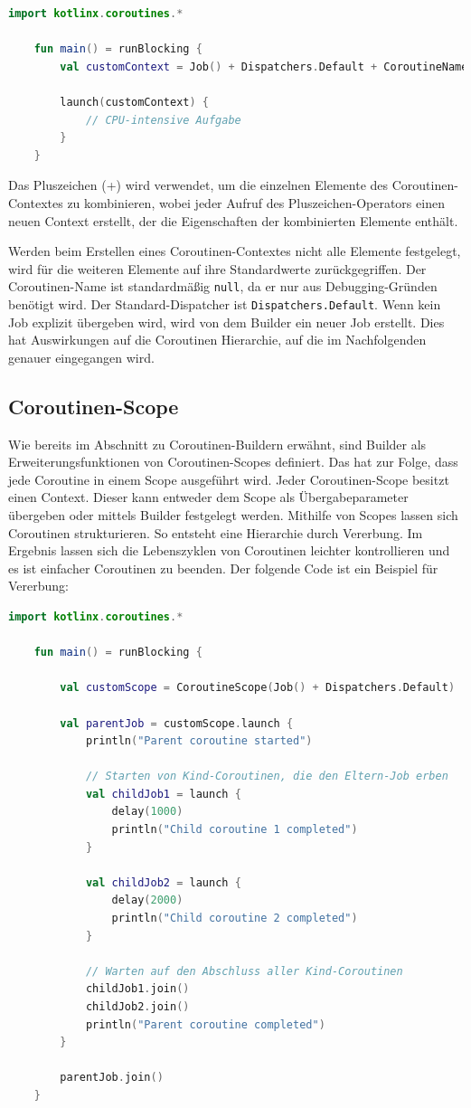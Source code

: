 \documentclass[fontsize=12pt,paper=a4,twoside=semi,parskip=half-,headsepline,headinclude]{scrreprt}
\begin{document}
\begin{lstlisting}[language=Kotlin]
	import kotlinx.coroutines.*

	fun main() = runBlocking {
		val customContext = Job() + Dispatchers.Default + CoroutineName("MyCoroutine")
	
		launch(customContext) {
			// CPU-intensive Aufgabe
		}
	}
\end{lstlisting}

Das Pluszeichen (+) \cite{Operator2024} wird verwendet, um die einzelnen Elemente des Coroutinen-Contextes zu kombinieren, wobei jeder Aufruf des Pluszeichen-Operators einen neuen Context erstellt, der die Eigenschaften der kombinierten Elemente enthält.

Werden beim Erstellen eines Coroutinen-Contextes nicht alle Elemente festgelegt, wird für die weiteren Elemente auf ihre Standardwerte zurückgegriffen. Der Coroutinen-Name ist standardmäßig \texttt{null}, da er nur aus Debugging-Gründen benötigt wird. Der Standard-Dispatcher ist \texttt{Dispatchers.Default}. Wenn kein Job explizit übergeben wird, wird von dem Builder ein neuer Job erstellt. Dies hat Auswirkungen auf die Coroutinen Hierarchie, auf die im Nachfolgenden genauer eingegangen wird.

\subsection{Coroutinen-Scope}
\label{subsec:coroutinescope}

Wie bereits im Abschnitt zu Coroutinen-Buildern erwähnt, sind Builder als  Erweiterungsfunktionen von Coroutinen-Scopes definiert. Das hat zur Folge, dass jede Coroutine in einem Scope ausgeführt wird. Jeder Coroutinen-Scope besitzt einen Context. Dieser kann entweder dem Scope als Übergabeparameter übergeben oder mittels Builder festgelegt werden. Mithilfe von Scopes lassen sich Coroutinen strukturieren. So entsteht eine Hierarchie durch Vererbung. Im Ergebnis lassen sich die Lebenszyklen von Coroutinen leichter kontrollieren und es ist einfacher Coroutinen zu beenden. Der folgende Code ist ein Beispiel für Vererbung:

\begin{lstlisting}[language=Kotlin]
	import kotlinx.coroutines.*

	fun main() = runBlocking {
	
    	val customScope = CoroutineScope(Job() + Dispatchers.Default)

		val parentJob = customScope.launch {
			println("Parent coroutine started")
			
			// Starten von Kind-Coroutinen, die den Eltern-Job erben
			val childJob1 = launch {
				delay(1000)
				println("Child coroutine 1 completed")
			}
		
			val childJob2 = launch {
				delay(2000)
				println("Child coroutine 2 completed")
			}
		
			// Warten auf den Abschluss aller Kind-Coroutinen
			childJob1.join()
			childJob2.join()
			println("Parent coroutine completed")
		}
	
		parentJob.join()
	}
\end{lstlisting}
\end{document}
